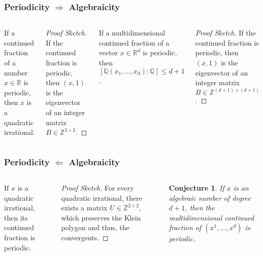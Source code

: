 \documentclass[aspectratio=169]{beamer}
\newtheorem{conjecture}{Conjecture}
\begin{document}
\begin{frame}
  \begin{center}
    
  \end{center}
\end{frame}

\begin{frame}
  \frametitle{Periodicity $\Rightarrow$ Algebraicity}
  \small
  \begin{columns}[T]
    \begin{theorem}
      If a continued fraction of a number $x ∈ ℝ$ is periodic, then $x$ is a
      quadratic irrational.
    \end{theorem}

    \begin{proof}[Proof Sketch]
      If the continued fraction is periodic,
      then $(x, 1)$ is the eigenvector of an integer matrix $B ∈ ℤ^{2×2}$.
    \end{proof}

    \begin{theorem}
      If a multidimensional continued fraction of a vector $x ∈ ℝ^d$ is
      periodic, then $[ℚ(x₁, …, x_d) : ℚ] ≤ d+1$.
    \end{theorem}

    \begin{proof}[Proof Sketch]
      If the continued fraction is periodic,
      then $(x, 1)$ is the eigenvector of an integer matrix $B ∈ ℤ^{(d+1)×(d+1)}$.
    \end{proof}
  \end{columns}
\end{frame}

\begin{frame}
  \frametitle{Periodicity $\Leftarrow$ Algebraicity}
  \small
  \begin{columns}[T]
    \begin{theorem}
      If $x$ is a quadratic irrational,
      then its continued fraction is periodic.
    \end{theorem}

    \begin{proof}[Proof Sketch]
      For every quadratic irrational,
      there exists a matrix $U ∈ ℤ^{2×2}$, which preserves the Klein polygon and thus, the convergents.
    \end{proof}

    \begin{conjecture}
      If $x$ is an algebraic number of degree $d+1$,
      then the multidimensional continued fraction of $(x^1, …, x^d)$ is
      periodic.
    \end{conjecture}
  \end{columns}
\end{frame}
\end{document}
